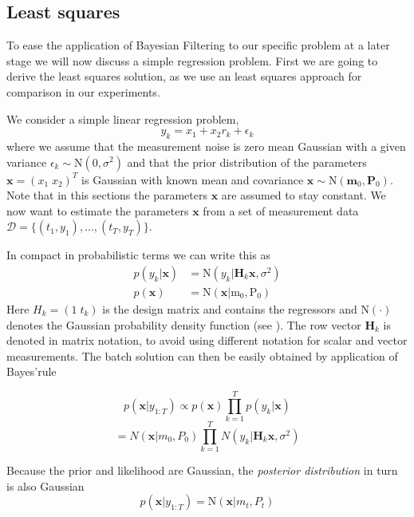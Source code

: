 \subsection{Least squares}
To ease the application of Bayesian Filtering to our specific problem
at a later stage we will now discuss a simple regression problem.
First we are going to derive the least squares solution, as
we use an least squares approach for comparison in our experiments.

We consider a simple linear regression problem,
\begin{equation}
  \label{regression_problem}
  y_k = x_1 + x_2 r_k + \epsilon_k
\end{equation}
where we assume that the measurement noise is zero mean Gaussian with
a given variance $\epsilon_k \sim \text{N}(0, \sigma^2)$ and that the
prior distribution of the
parameters $\mathbf{x} = (x_{1} \; x_{2})^T$ is
Gaussian with known mean and covariance
$\mathbf{x} \sim \text{N}(\mathbf{m}_0, \mathbf{P}_0)$. Note that
in this sections the parameters $\mathbf{x}$ are assumed to stay constant.
We now want to estimate
the parameters $\mathbf{x}$ from a set of measurement
data $\mathcal{D} = \{(t_1, y_1),...,(t_T, y_T)\}$.

In compact in probabilistic terms we can write this as
\begin{equation}
  \label{regression_model_1}
  \begin{aligned}
    p(y_k | \mathbf{x}) &= \text{N}(y_k | \mathbf{H}_k \mathbf{x}, \sigma^2) \\
    p(\mathbf{x}) &= \text{N}(\mathbf{x} | \text{m}_0, \text{P}_0)
  \end{aligned}
\end{equation}
Here $H_k = (1 \;t_k)$ is the design matrix and
contains the regressors and N$(\cdot)$ denotes
the Gaussian probability density
function (see ). The row vector $\mathbf{H}_k$ is denoted
in matrix notation, to avoid using different notation for scalar
and vector measurements.
The batch solution can then be easily obtained by application of Bayes'rule

$$ p(\mathbf{x} | y_{1:T})  \propto p(\mathbf{x}) \prod^T_{k=1} p (y_k | \mathbf{x}) $$
$$ = N(\mathbf{x} | m_0, P_0) \prod^T_{k=1} N(y_k | \textbf{H}_k \mathbf{x}, \sigma^2) $$

Because the prior and likelihood are Gaussian, the \textit{posterior distribution}
in turn is also Gaussian
$$ p(\mathbf{x} | y_{1:T}) = \text{N}(\mathbf{x} | m_t, P_t) $$

